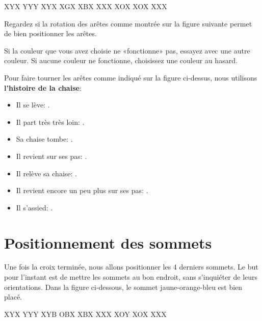 \begin{center}	
	\RubikFaceUp%
	{X}{Y}{X}%
	{Y}{Y}{Y}%
	{X}{Y}{X}
	\RubikFaceRight%
	{X}{G}{X}%
	{X}{B}{X}%
	{X}{X}{X}
	\RubikFaceFront%
	{X}{O}{X}%
	{X}{O}{X}%
	{X}{X}{X}
\end{center}

Regardez si la rotation des arêtes comme montrée sur la figure suivante permet de bien positionner les arêtes. 
 

\begin{center}	
\end{center}

Si la couleur que vous avez choisie ne «fonctionne» pas, essayez avec une autre couleur. Si aucune couleur ne fonctionne, choisissez une couleur au hasard.

Pour faire tourner les arêtes comme indiqué sur la figure ci-dessus, nous utilisons \textbf{l'histoire de la chaise}:

\begin{itemize}
	\item Il se lève: .
	\item Il part très très loin: .
	\item Sa chaise tombe: .
	\item Il revient sur ses pas: .
	\item Il relève sa chaise: .
	\item Il revient encore un peu plus sur ses pas: .	
	\item Il s'assied: .
\end{itemize}

\section{Positionnement des sommets}

Une fois la croix terminée, nous allons positionner les 4 derniers sommets. Le but pour l'instant est de mettre les sommets au bon endroit, sans s'inquiéter de leurs orientations. Dans la figure ci-dessous, le sommet jaune-orange-bleu est bien placé.

\begin{center}	
	\RubikFaceUp%
	{X}{Y}{X}%
	{Y}{Y}{Y}%
	{X}{Y}{B}
	\RubikFaceRight%
	{O}{B}{X}%
	{X}{B}{X}%
	{X}{X}{X}
	\RubikFaceFront%
	{X}{O}{Y}%
	{X}{O}{X}%
	{X}{X}{X}
\end{center}

